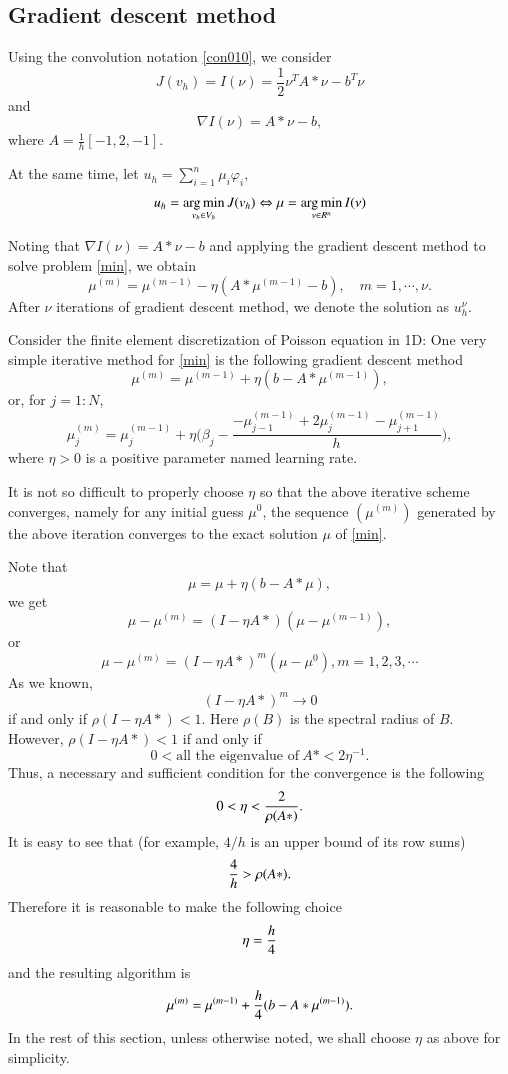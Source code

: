 \subsection{Gradient descent method}

Using the convolution notation \eqref{con010}, we consider
$$
J(v_h)=I(\nu)=\frac12\nu^TA\ast\nu-b^T\nu
$$
and 
$$
\nabla I(\nu) =A\ast \nu -b,
$$
where $A=\frac{1}{h}[-1,2, -1]$.

At the same time, let $\displaystyle u_h=\sum_{i=1}^n\mu_i\varphi_i,$
\begin{equation}\label{min}
\displaystyle u_h=\operatorname*{arg\,min}_{v_h\in V_h} J(v_h)\Leftrightarrow \mu=\operatorname*{arg\,min}_{\nu \in R^n} I(\nu)
\end{equation}

Noting that $\nabla I(\nu) =A\ast \nu -b$ and applying the gradient descent method to solve problem \eqref{min}, we obtain 
$$
\mu^{(m)}=\mu^{(m-1)}-\eta(A\ast \mu^{(m-1)}-b),\quad m=1,\cdots,\nu. 
$$
After $\nu$ iterations of gradient descent method, we denote the solution as $u_h^{\nu}$.

Consider the finite element discretization of Poisson equation in 1D: One very simple iterative method for \eqref{min} is the following
gradient descent method
$$
       \mu^{(m)}=\mu^{(m-1)}+\eta (b-A\ast \mu^{(m-1)}),
$$
or, for $j=1:N$, 
$$ 
\mu^{(m)}_j=\mu^{(m-1)}_j+\eta
\bigg(\beta_j-\frac{-\mu^{(m-1)}_{j-1}+2\mu^{(m-1)}_j-\mu^{(m-1)}_{j+1}}{h}\bigg),
$$
where $\eta>0$ is a positive parameter named learning rate.  

It is not so difficult to
properly choose $\eta$ so that the above iterative scheme converges,
namely for any initial guess $\mu^0$, the sequence $(\mu^{(m)})$ generated
by the above iteration converges to the exact solution $\mu$ of
\eqref{min}.

Note that
$$
        \mu=\mu+\eta (b-A\ast\mu),
$$
we get
$$
        \mu-\mu^{(m)}=(I-\eta A\ast)(\mu-\mu^{(m-1)}),
$$
or
$$
        \mu-\mu^{(m)}=(I-\eta A\ast)^m(\mu-\mu^0), m=1,2,3,\cdots
$$
As we known,
$$
(I-\eta A\ast)^m\longrightarrow 0
$$
if and only if $\rho (I-\eta A\ast)<1$. Here $\rho(B)$ is the spectral 
radius of $B$. However, $\rho (I-\eta A\ast)<1$ if and only if
$$
0< \mbox{all the eigenvalue of}~ A\ast< 2\eta^{-1}.
$$
Thus, a necessary and sufficient condition for the 
convergence is the following
$$
       0< \eta<{2\over \rho(A\ast)}.
$$
It is easy to see that
(for example, $4/h$ is an upper bound of its row sums)
$$
{4\over {h}}> \rho(A\ast).
$$
Therefore it is reasonable to make the following choice
$$
        \eta={h \over 4}
$$
and the resulting algorithm is 
\begin{equation}\Label{1dRichardson}
        \mu^{(m)}=\mu^{(m-1)}+{h\over4} (b-A\ast\mu^{(m-1)}).
\end{equation}
In the rest of this section, unless otherwise noted, we shall choose
$\eta$ as above for simplicity.

